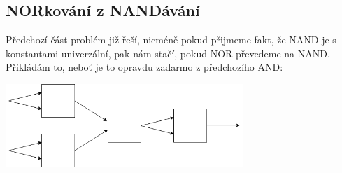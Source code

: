 \documentclass[a4paper]{article}
\begin{document}
\subsection*{NORkování z NANDávání}
Předchozí část problém již řeší, nicméně pokud přijmeme fakt, že NAND je s konstantami univerzální, pak nám stačí, pokud NOR převedeme na NAND. Přikládám to, neboť je to opravdu zadarmo z předchozího AND:


\begin{center}
\includegraphics[width=9cm]{nand}
\end{center}
\end{document}
